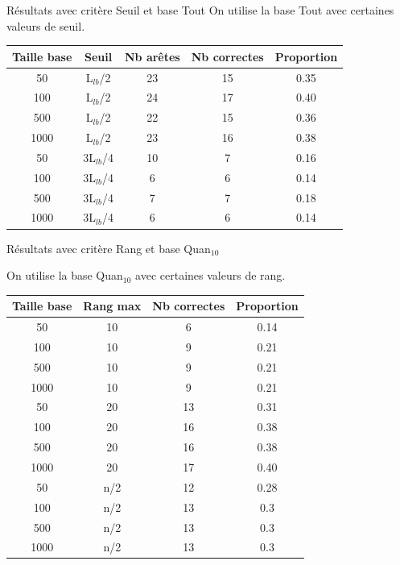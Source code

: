 \documentclass{beamer}
\begin{document}
\begin{frame}{Résultats avec critère Seuil et base Tout}
On utilise la base Tout avec certaines valeurs de seuil.
\begin{tabular}{|c|c|c|c|c|}
   \hline
   Taille base & Seuil & Nb arêtes & Nb correctes & Proportion\\
   \hline
   50 & L$_{lb}$/2 & 23 & 15 & 0.35  \\
   \hline
   100 & L$_{lb}$/2 & 24 & 17 & 0.40  \\
   \hline
   500 & L$_{lb}$/2 & 22 & 15 & 0.36  \\
   \hline
   1000 & L$_{lb}$/2 & 23 & 16 & 0.38  \\
   \hline
   \hline
   50 & 3L$_{lb}$/4 & 10 & 7 & 0.16  \\
   \hline
   100 & 3L$_{lb}$/4 & 6 & 6 & 0.14  \\
   \hline
   500 & 3L$_{lb}$/4 & 7 & 7 & 0.18  \\
   \hline
   1000 & 3L$_{lb}$/4 & 6 & 6 & 0.14  \\
   \hline
\end{tabular}
\end{frame}


\begin{frame}{Résultats avec critère Rang et base Quan$_{10}$}

On utilise la base Quan$_{10}$ avec certaines valeurs de rang.
\begin{tabular}{|c|c|c|c|}
   \hline
   Taille base & Rang max & Nb correctes & Proportion\\
   \hline
   50 & 10  & 6 & 0.14  \\
   \hline
   100 & 10  & 9 & 0.21  \\
   \hline
   500 & 10  & 9 & 0.21  \\
   \hline
   1000 & 10 & 9 & 0.21  \\
   \hline
   \hline
   50 & 20 & 13 & 0.31  \\
   \hline
   100 & 20 & 16 & 0.38  \\
   \hline
   500 & 20 & 16 & 0.38  \\
   \hline
   1000 & 20 & 17 & 0.40  \\
   \hline
   \hline
   50 & n/2 & 12 & 0.28  \\
   \hline
   100 & n/2 & 13 & 0.3  \\
   \hline
   500 & n/2 & 13 & 0.3  \\
   \hline
   1000 & n/2 & 13 & 0.3  \\
   \hline
\end{tabular}

\end{frame}
\end{document}
